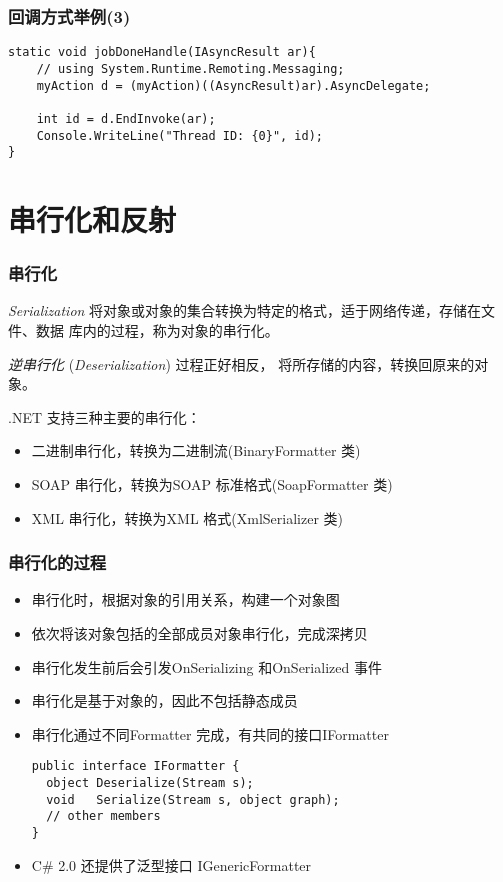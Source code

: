\begin{frame}[fragile]
\frametitle{回调方式举例(3)}
\begin{lstlisting}
static void jobDoneHandle(IAsyncResult ar){
    // using System.Runtime.Remoting.Messaging;
    myAction d = (myAction)((AsyncResult)ar).AsyncDelegate;

    int id = d.EndInvoke(ar);
    Console.WriteLine("Thread ID: {0}", id);
}
\end{lstlisting}
\end{frame}


\section{串行化和反射}

\begin{frame}
\frametitle{串行化}
\begin{block}{\textit{Serialization}}
\CJKindent 将对象或对象的集合转换为特定的格式，适于网络传递，存储在文件、数据
库内的过程，称为对象的串行化。

{\em 逆串行化} (\textit{Deserialization}) 过程正好相反，
将所存储的内容，转换回原来的对象。
\end{block}
.NET 支持三种主要的串行化：
\begin{itemize}
\item 二进制串行化，转换为二进制流(BinaryFormatter 类)
\item SOAP 串行化，转换为SOAP 标准格式(SoapFormatter 类)
\item XML 串行化，转换为XML 格式(XmlSerializer 类)
\end{itemize}
\end{frame}

\begin{frame}[fragile]
\frametitle{串行化的过程}
\begin{itemize}
\item 串行化时，根据对象的引用关系，构建一个对象图
\item 依次将该对象包括的全部成员对象串行化，完成深拷贝
\item 串行化发生前后会引发OnSerializing 和OnSerialized 事件
\item 串行化是基于对象的，因此不包括静态成员
\medskip \pause
\item 串行化通过不同Formatter 完成，有共同的接口IFormatter
\begin{lstlisting}
public interface IFormatter {
  object Deserialize(Stream s);
  void   Serialize(Stream s, object graph);
  // other members
}
\end{lstlisting}
\item C\# 2.0 还提供了泛型接口 IGenericFormatter
\end{itemize}
\end{frame}

